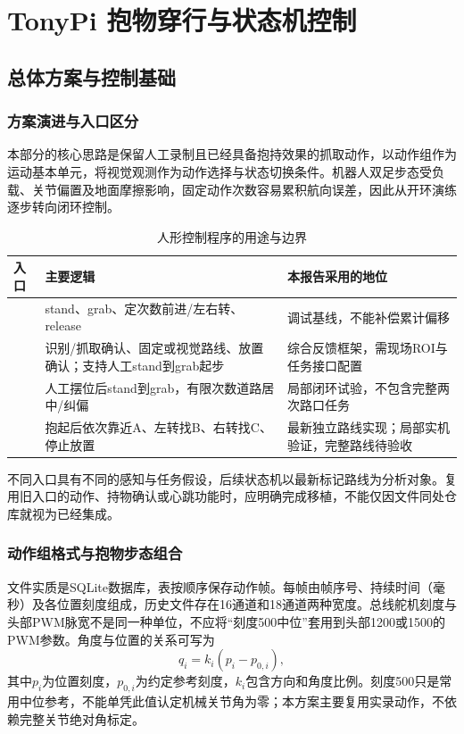 \section{TonyPi 抱物穿行与状态机控制}
\subsection{总体方案与控制基础}
\subsubsection{方案演进与入口区分}
本部分的核心思路是保留人工录制且已经具备抱持效果的抓取动作，以动作组作为运动基本单元，将视觉观测作为动作选择与状态切换条件。机器人双足步态受负载、关节偏置及地面摩擦影响，固定动作次数容易累积航向误差，因此从开环演练逐步转向闭环控制。
\begin{table}[H]\centering\small
\caption{人形控制程序的用途与边界}
\begin{tabularx}{\linewidth}{p{36mm}YY}\toprule
入口 & 主要逻辑 & 本报告采用的地位\\\midrule
{} & stand、grab、定次数前进/左右转、release & 调试基线，不能补偿累计偏移\\
 & 识别/抓取确认、固定或视觉路线、放置确认；支持人工stand到grab起步 & 综合反馈框架，需现场ROI与任务接口配置\\
 & 人工摆位后stand到grab，有限次数道路居中/纠偏 & 局部闭环试验，不包含完整两次路口任务\\
 & 抱起后依次靠近A、左转找B、右转找C、停止放置 & 最新独立路线实现；局部实机验证，完整路线待验收\\\bottomrule
\end{tabularx}\end{table}

不同入口具有不同的感知与任务假设，后续状态机以最新标记路线为分析对象。复用旧入口的动作、持物确认或心跳功能时，应明确完成移植，不能仅因文件同处仓库就视为已经集成。


\subsubsection{动作组格式与抱物步态组合}
文件实质是SQLite数据库，表按顺序保存动作帧。每帧由帧序号、持续时间（毫秒）及各位置刻度组成，历史文件存在16通道和18通道两种宽度。总线舵机刻度与头部PWM脉宽不是同一种单位，不应将“刻度500中位”套用到头部1200或1500的PWM参数。角度与位置的关系可写为
\begin{equation}
q_i=k_i(p_i-p_{0,i}),
\end{equation}
其中$p_i$为位置刻度，$p_{0,i}$为约定参考刻度，$k_i$包含方向和角度比例。刻度500只是常用中位参考，不能单凭此值认定机械关节角为零；本方案主要复用实录动作，不依赖完整关节绝对角标定。

